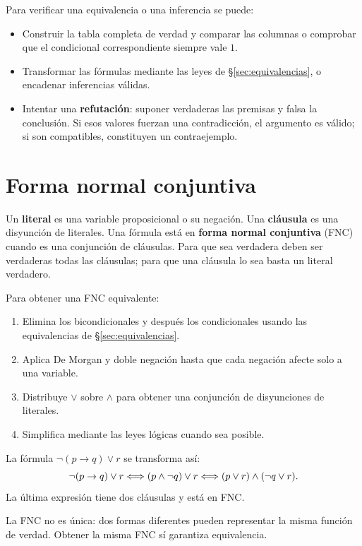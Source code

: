 Para verificar una equivalencia o una inferencia se puede:
\begin{itemize}
 \item Construir la tabla completa de verdad y comparar las columnas
       o comprobar que el condicional correspondiente siempre vale $1$.
 \item Transformar las fórmulas mediante las leyes de
       \S\ref{sec:equivalencias}, o encadenar inferencias válidas.
 \item Intentar una \textbf{refutación}: suponer verdaderas las premisas
       y falsa la conclusión. Si esos valores fuerzan una contradicción,
       el argumento es válido; si son compatibles, constituyen un contraejemplo.
\end{itemize}

\section{Forma normal conjuntiva}
\label{sec:fnc}

Un \textbf{literal} es una variable proposicional o su negación.
Una \textbf{cláusula} es una disyunción de literales.
Una fórmula está en \textbf{forma normal conjuntiva} (FNC) cuando es una
conjunción de cláusulas. Para que sea verdadera deben ser verdaderas
todas las cláusulas; para que una cláusula lo sea basta un literal verdadero.

Para obtener una FNC equivalente:
\begin{enumerate}
 \item Elimina los bicondicionales y después los condicionales usando
       las equivalencias de \S\ref{sec:equivalencias}.
 \item Aplica De Morgan y doble negación hasta que cada negación
       afecte solo a una variable.
 \item Distribuye $\vee$ sobre $\wedge$ para obtener una conjunción
       de disyunciones de literales.
 \item Simplifica mediante las leyes lógicas cuando sea posible.
\end{enumerate}

\begin{ejemplo}
La fórmula $\neg(p\to q)\vee r$ se transforma así:
\[
 \neg(p\to q)\vee r
 \Longleftrightarrow(p\wedge\neg q)\vee r
 \Longleftrightarrow(p\vee r)\wedge(\neg q\vee r).
\]
La última expresión tiene dos cláusulas y está en FNC.
\end{ejemplo}

La FNC no es única: dos formas diferentes pueden representar la misma
función de verdad. Obtener la misma FNC sí garantiza equivalencia.

